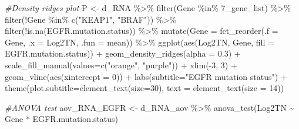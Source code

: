 \documentclass[
]{article}
\newenvironment{Shaded}{\begin{snugshade}}{\end{snugshade}}
\newcommand{\AttributeTok}[1]{\textcolor[rgb]{0.77,0.63,0.00}{#1}}
\newcommand{\CommentTok}[1]{\textcolor[rgb]{0.56,0.35,0.01}{\textit{#1}}}
\newcommand{\DecValTok}[1]{\textcolor[rgb]{0.00,0.00,0.81}{#1}}
\newcommand{\FloatTok}[1]{\textcolor[rgb]{0.00,0.00,0.81}{#1}}
\newcommand{\FunctionTok}[1]{\textcolor[rgb]{0.00,0.00,0.00}{#1}}
\newcommand{\NormalTok}[1]{#1}
\newcommand{\OtherTok}[1]{\textcolor[rgb]{0.56,0.35,0.01}{#1}}
\newcommand{\SpecialCharTok}[1]{\textcolor[rgb]{0.00,0.00,0.00}{#1}}
\newcommand{\StringTok}[1]{\textcolor[rgb]{0.31,0.60,0.02}{#1}}
\begin{document}
\begin{Shaded}
\begin{Highlighting}[]
\CommentTok{\#Density ridges plot}
\NormalTok{P }\OtherTok{\textless{}{-}}\NormalTok{ d\_RNA }\SpecialCharTok{\%\textgreater{}\%}
 \FunctionTok{filter}\NormalTok{(Gene }\SpecialCharTok{\%in\%} \StringTok{\textasciigrave{}}\AttributeTok{7\_gene\_list}\StringTok{\textasciigrave{}}\NormalTok{) }\SpecialCharTok{\%\textgreater{}\%}
 \FunctionTok{filter}\NormalTok{(}\SpecialCharTok{!}\NormalTok{Gene }\SpecialCharTok{\%in\%} \FunctionTok{c}\NormalTok{(}\StringTok{"KEAP1"}\NormalTok{, }\StringTok{"BRAF"}\NormalTok{)) }\SpecialCharTok{\%\textgreater{}\%}
 \FunctionTok{filter}\NormalTok{(}\SpecialCharTok{!}\FunctionTok{is.na}\NormalTok{(EGFR.mutation.status)) }\SpecialCharTok{\%\textgreater{}\%}
 \FunctionTok{mutate}\NormalTok{(}\AttributeTok{Gene =} \FunctionTok{fct\_reorder}\NormalTok{(}\AttributeTok{.f =}\NormalTok{ Gene, }\AttributeTok{.x =}\NormalTok{ Log2TN, }\AttributeTok{.fun =}\NormalTok{ mean)) }\SpecialCharTok{\%\textgreater{}\%}
 \FunctionTok{ggplot}\NormalTok{(}\FunctionTok{aes}\NormalTok{(Log2TN, Gene, }\AttributeTok{fill =}\NormalTok{ EGFR.mutation.status)) }\SpecialCharTok{+}  
 \FunctionTok{geom\_density\_ridges}\NormalTok{(}\AttributeTok{alpha =} \FloatTok{0.3}\NormalTok{) }\SpecialCharTok{+}
 \FunctionTok{scale\_fill\_manual}\NormalTok{(}\AttributeTok{values=}\FunctionTok{c}\NormalTok{(}\StringTok{"orange"}\NormalTok{, }\StringTok{"purple"}\NormalTok{)) }\SpecialCharTok{+}
 \FunctionTok{xlim}\NormalTok{(}\SpecialCharTok{{-}}\DecValTok{3}\NormalTok{, }\DecValTok{3}\NormalTok{) }\SpecialCharTok{+}
 \FunctionTok{geom\_vline}\NormalTok{(}\FunctionTok{aes}\NormalTok{(}\AttributeTok{xintercept =} \DecValTok{0}\NormalTok{)) }\SpecialCharTok{+}
 \FunctionTok{labs}\NormalTok{(}\AttributeTok{subtitle=}\StringTok{"EGFR mutation status"}\NormalTok{) }\SpecialCharTok{+}
 \FunctionTok{theme}\NormalTok{(}\AttributeTok{plot.subtitle=}\FunctionTok{element\_text}\NormalTok{(}\AttributeTok{size=}\DecValTok{30}\NormalTok{),}
 \AttributeTok{text =} \FunctionTok{element\_text}\NormalTok{(}\AttributeTok{size =} \DecValTok{14}\NormalTok{))}

\CommentTok{\#ANOVA test}
\NormalTok{aov\_RNA\_EGFR }\OtherTok{\textless{}{-}}\NormalTok{ d\_RNA\_aov }\SpecialCharTok{\%\textgreater{}\%} \FunctionTok{anova\_test}\NormalTok{(Log2TN }\SpecialCharTok{\textasciitilde{}}\NormalTok{ Gene }\SpecialCharTok{*}\NormalTok{ EGFR.mutation.status)}
\end{Highlighting}
\end{Shaded}
\end{document}
